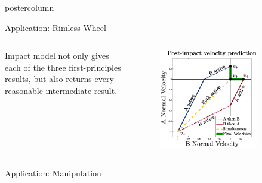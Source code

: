 \documentclass[final,hyperref={pdfpagelabels=false},5pt]{beamer}
\begin{document}
\begin{frame}
\begin{columns}
\begin{column}{.49\textwidth}
\begin{beamercolorbox}[center,wd=\textwidth]{postercolumn}
\begin{minipage}[T]{.95\textwidth}
{             \begin{block}{Application: Rimless Wheel}
             \centering
             \begin{columns}[c]
				\begin{column}{.47\hsize}
				\justify
				Impact model not only gives each of the three first-principles results, but also returns every reasonable \mbox{intermediate} result.
				\end{column}
				\begin{column}{.47\hsize}
				\centering
				\vspace{0ex}
				\begin{figure}
				\centering
              	\includegraphics[width=0.8\textwidth]{rimless_example_2_4}
              	\end{figure} 
				\end{column}
				\end{columns}
             \centering
             \end{block}
             
             \begin{block}{Application: Manipulation}
             \centering
             \begin{columns}[c]
             

\end{columns}
\end{block}}
\end{minipage}
\end{beamercolorbox}
\end{column}
\end{columns}
\end{frame}
\end{document}

